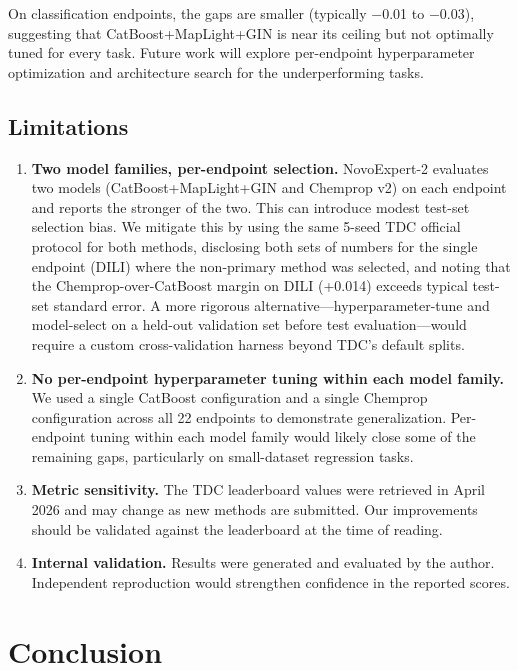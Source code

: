 \documentclass[11pt]{article}
\begin{document}
On classification endpoints, the gaps are smaller (typically $-$0.01 to $-$0.03), suggesting that CatBoost+MapLight+GIN is near its ceiling but not optimally tuned for every task. Future work will explore per-endpoint hyperparameter optimization and architecture search for the underperforming tasks.

\subsection{Limitations}

\begin{enumerate}
    \item \textbf{Two model families, per-endpoint selection.} NovoExpert-2 evaluates two models (CatBoost+MapLight+GIN and Chemprop v2) on each endpoint and reports the stronger of the two. This can introduce modest test-set selection bias. We mitigate this by using the same 5-seed TDC official protocol for both methods, disclosing both sets of numbers for the single endpoint (DILI) where the non-primary method was selected, and noting that the Chemprop-over-CatBoost margin on DILI (+0.014) exceeds typical test-set standard error. A more rigorous alternative---hyperparameter-tune and model-select on a held-out validation set before test evaluation---would require a custom cross-validation harness beyond TDC's default splits.
    \item \textbf{No per-endpoint hyperparameter tuning within each model family.} We used a single CatBoost configuration and a single Chemprop configuration across all 22 endpoints to demonstrate generalization. Per-endpoint tuning within each model family would likely close some of the remaining gaps, particularly on small-dataset regression tasks.
    \item \textbf{Metric sensitivity.} The TDC leaderboard values were retrieved in April 2026 and may change as new methods are submitted. Our improvements should be validated against the leaderboard at the time of reading.
    \item \textbf{Internal validation.} Results were generated and evaluated by the author. Independent reproduction would strengthen confidence in the reported scores.
\end{enumerate}

\section{Conclusion}
\end{document}
